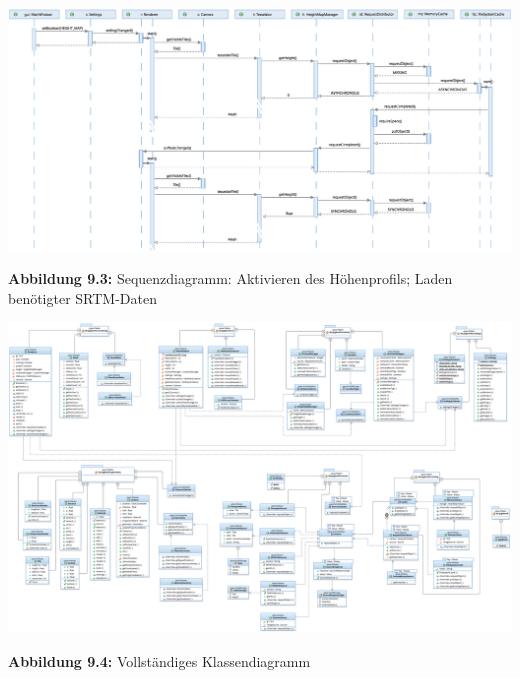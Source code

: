 \documentclass[10pt]{scrreprt}
\begin{document}
\newpage
\thispagestyle{empty}
\vspace*{1cm}
\includegraphics[scale=0.46,angle=90,origin=c]{sequenz-height.eps}
\hspace{5mm}
\begin{rotate}{90}
\textbf{Abbildung 9.3:} Sequenzdiagramm: Aktivieren des Höhenprofils; Laden benötigter SRTM-Daten
\end{rotate}

\newpage
\thispagestyle{empty}
\includegraphics[scale=0.34,angle=90,origin=c]{JoglDiagramm_Main.eps}
\hspace{5mm}
\begin{rotate}{90}
\textbf{Abbildung 9.4:} Vollständiges Klassendiagramm
\end{rotate}


\restoregeometry
\end{document}
